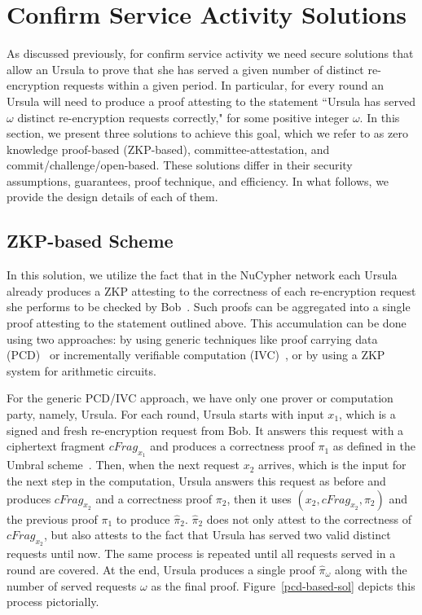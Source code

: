 \section{Confirm Service Activity Solutions}
\label{confirm-service-activity}
As discussed previously, for confirm service activity we need secure solutions that allow an Ursula to prove that she has served a given number of distinct re-encryption requests within a given period. In particular, for every round an Ursula will need to produce a proof attesting to the statement ``Ursula has served $\omega$ distinct re-encryption requests correctly," for some positive integer $\omega$. In this section, we present three solutions to achieve this goal, which we refer to as zero knowledge proof-based (ZKP-based), committee-attestation, and commit/challenge/open-based. These solutions differ in their security assumptions, guarantees, proof technique, and efficiency. In what follows, we provide the design details of each of them.


\subsection{ZKP-based Scheme}
In this solution, we utilize the fact that in the NuCypher network each Ursula already produces a ZKP attesting to the correctness of each re-encryption request she performs to be checked by Bob~\cite{umbral2018}. Such proofs can be aggregated into a single proof attesting to the statement outlined above. This accumulation can be done using two approaches: by using generic techniques like proof carrying data (PCD)~\cite{chiesa2010proof} or incrementally verifiable computation (IVC)~\cite{valiant08}, or by using a ZKP system for arithmetic circuits. 


For the generic PCD/IVC approach, we have only one prover or computation party, namely, Ursula. For each round, Ursula starts with input $x_1$, which is a signed and fresh re-encryption request from Bob. It answers this request with a ciphertext fragment $cFrag_{x_1}$ and produces a correctness proof $\pi_1$ as defined in the Umbral scheme~\cite{umbral2018}. Then, when the next request $x_2$ arrives, which is the input for the next step in the computation, Ursula answers this request as before and produces $cFrag_{x_2}$ and a correctness proof $\pi_2$, then it uses $(x_2, cFrag_{x_2}, \pi_2)$ and the previous proof $\pi_1$ to produce $\hat{\pi}_2$. $\hat{\pi}_2$ does not only attest to the correctness of $cFrag_{x_2}$, but also attests to the fact that Ursula has served two valid distinct requests until now. The same process is repeated until all requests served in a round are covered. At the end, Ursula produces a single proof $\hat{\pi}_{\omega}$ along with the number of served requests $\omega$ as the final proof. Figure~\ref{pcd-based-sol} depicts this process pictorially.


